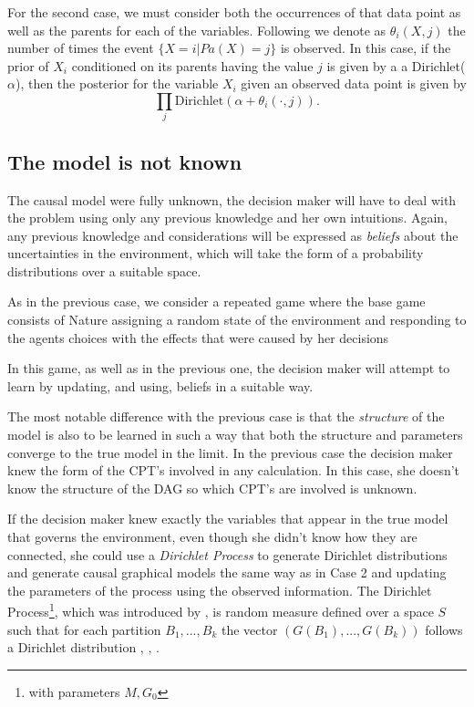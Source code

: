 \documentclass{article}
\begin{document}
For the second case, we must consider both the occurrences of that data point as well as the parents for each of the variables. Following \cite{barber2012bayesian} we denote as $\theta_i(X,j)$ the number of times the event $\{X=i | Pa(X)=j\}$ is observed. In this case, if the prior of $X_i$ conditioned on its parents having the value $j$ is given by a a Dirichlet($\alpha$), then the posterior for the variable $X_i$ given an observed data point is given by 
\[ \prod_j \textrm{Dirichlet}(\alpha + \theta_i(\cdot,j)). \]

\subsection{The model is not known}
The causal model were fully unknown, the decision maker will have to deal with the problem using only any previous knowledge and her own intuitions. Again, any previous knowledge and considerations will be expressed as \textit{beliefs} about the uncertainties in the environment, which will take the form of a probability distributions over a suitable space. 

As in the previous case, we consider a repeated game where the base game consists of Nature assigning a random state of the environment and responding to the agents choices with the effects that were caused by her decisions

In this game, as well as in the previous one, the decision maker will attempt to learn by updating, and using, beliefs in a suitable way. 

The most notable difference with the previous case is that the \textit{structure} of the model is also to be learned in such a way that both the structure and parameters converge to the true model in the limit. In the previous case the decision maker knew the form of the CPT's involved in any calculation. In this case, she doesn't know the structure of the DAG so which CPT's are involved is unknown.

If the decision maker knew exactly the variables that appear in the true model that governs the environment, even though she didn't know how they are connected, she could use a \textit{Dirichlet Process} to generate Dirichlet distributions and generate causal graphical models the same way as in Case 2 and updating the parameters of the process using the observed information. The Dirichlet Process\footnote{with parameters $M,G_0$}, which was introduced by \cite{ferguson1973bayesian}, is random measure defined over a space $S$ such that for each partition $B_1,...,B_k$ the vector $(G(B_1),...,G(B_k))$ follows a Dirichlet distribution \cite{hjort2010bayesian}, \cite{muller2016bayesian}, \cite{ghosal2017fundamentals}. 
\end{document}
